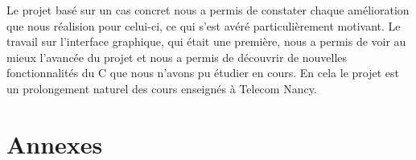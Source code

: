 \documentclass[light]{ceri}
\begin{document}
Le projet basé sur un cas concret nous a permis de constater chaque amélioration que nous réalision pour celui-ci, ce qui s'est avéré particulièrement motivant. Le travail sur l'interface graphique, qui était une première, nous a permis de voir au mieux l'avancée du projet et nous a permis de découvrir de nouvelles fonctionnalités du C que nous n'avons pu étudier en cours. En cela le projet est un prolongement naturel des cours enseignés à Telecom Nancy.

\section{Annexes}








\thispagestyle{fancy}
\end{document}
